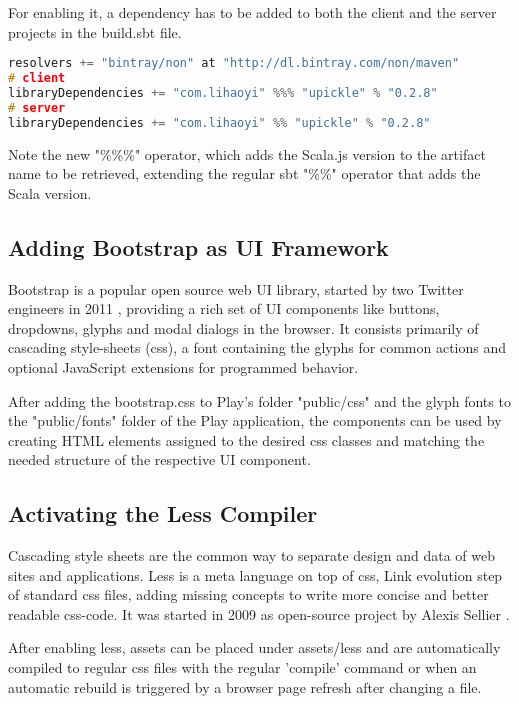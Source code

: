 For enabling it, a dependency has to be added to both the client and the server projects in the build.sbt file.

\begin{lstlisting}[caption={Adding a dependency to the client and server project},basicstyle=\tiny\ttfamily,language=c,aboveskip=15pt]
resolvers += "bintray/non" at "http://dl.bintray.com/non/maven"
# client
libraryDependencies += "com.lihaoyi" %%% "upickle" % "0.2.8"
# server
libraryDependencies += "com.lihaoyi" %% "upickle" % "0.2.8"
\end{lstlisting}

Note the new "\%\%\%" operator, which adds the Scala.js version to the artifact name to be retrieved, extending the regular sbt "\%\%" operator that adds the Scala version.

\subsection{Adding Bootstrap as UI Framework}

Bootstrap is a popular open source web UI library, started by two Twitter engineers in 2011 \cite{bootstrap}, providing a rich set of UI components like buttons, dropdowns, glyphs and modal dialogs in the browser. It consists primarily of cascading style-sheets (css), a font containing the glyphs for common actions and optional JavaScript extensions for programmed behavior.

After adding the bootstrap.css to Play's folder "public/css" and the glyph fonts to the "public/fonts" folder of the Play application, the components can be used by creating HTML elements assigned to the desired css classes and matching the needed structure of the respective UI component.

\subsection{Activating the Less Compiler}

Cascading style sheets are the common way to separate design and data of web sites and applications. Less is a meta language on top of css, Link
evolution step of standard css files, adding missing concepts to write more concise and better readable css-code. It was started in 2009 as open-source project by Alexis Sellier \cite{less}.

After enabling less, assets can be placed under assets/less and are automatically compiled to regular css files with the regular 'compile' command or when an automatic rebuild is triggered by a browser page refresh after changing a file.


